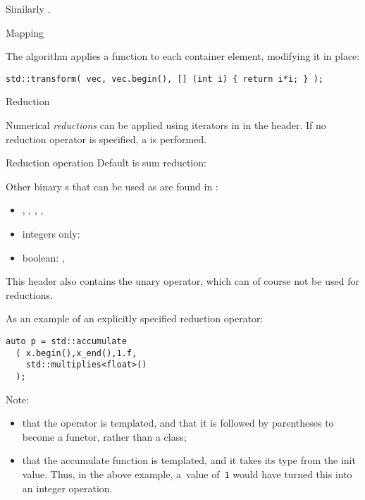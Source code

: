 Similarly .

 {Mapping}

The  algorithm applies a function to each
container element, modifying it in place:
\begin{lstlisting}
std::transform( vec, vec.begin(), [] (int i) { return i*i; } );
\end{lstlisting}

 {Reduction}

Numerical \emph{reductions} can be applied using iterators
in  in the  header.
If no reduction operator is specified, a
is performed.

\begin{block}{Reduction operation}
  \label{sl:vec-accumulate}
  Default is sum reduction:
\end{block}

Other binary s
that can be used as 
are found in :
\begin{itemize}
\item
  ,
  ,
  ,
  ,
\item integers only:
\item boolean:
  ,   
\end{itemize}

This header also contains the unary
 operator, which 
can of course not be used for reductions.

As an example of an explicitly specified reduction operator:
\begin{lstlisting}
auto p = std::accumulate
  ( x.begin(),x_end(),1.f,
    std::multiplies<float>()
  );
\end{lstlisting}
Note:
\begin{itemize}
\item that the operator is templated,
  and that it is followed by parentheses
  to become a functor, rather than a class;
\item that the accumulate function is templated,
  and it takes its type from the init value.
  Thus, in the above example, a~value of~\lstinline+1+
  would have turned this into an integer operation.
\end{itemize}

